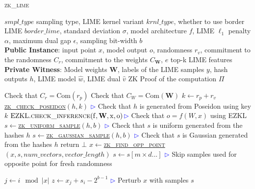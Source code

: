 \begin{algorithm}[H]
\begin{algorithmic}[1]
   \caption{\textsc{zk\_lime}}
   \label{alg:zk_lime}
    $smpl\_type$ sampling type, LIME kernel variant $krnl\_type$, whether to use border LIME $border\_lime$, standard deviation $\sigma$, model architecture $f$, LIME $\ell_1$ penalty $\alpha$, maximum dual gap $\epsilon$, sampling bit-width $b$\\
    \STATE \textbf{Public Instance}: input point $x$, model output $o$, randomness $r_v$, commitment to the randomness $C_r$, commitment to the weights $C_\mathbf{W}$, $e$ top-k LIME features\\
    \STATE \textbf{Private Witness}: Model weights $\mathbf{W}$, labels of the LIME samples $y$, hash outputs $h$, LIME model $\hat{w}$, LIME dual $\hat{v}$
     ZK Proof of the computation $\Pi$

    \STATE Check that $C_r = \text{Com}(r_p)$
    \STATE Check that $C_W = \text{Com}(\mathbf{W})$
    \STATE $k \leftarrow r_p + r_v$
    \STATE \hyperref[alg:zk_check_poseidon]{\textsc{zk\_check\_poseidon}}$(h, k)$ \hfill\textcolor{blue}{$\rhd$} Check that $h$ is generated from Poseidon using key $k$
    \STATE $\rm{EZKL}.\textsc{check\_inference}(f, \mathbf{W}, x, o)$\hfill\textcolor{blue}{$\rhd$} Check that $o = f(W, x)$ using EZKL
        \STATE $s \gets $\hyperref[alg:zk_uniform_sample]{\textsc{zk\_uniform\_sample}}$\left( h, b\right)$ \hfill\textcolor{blue}{$\rhd$} Check that $s$ is uniform generated from the hashes $h$
        \STATE $s \gets $\hyperref[alg:zk_gaussian_sample]{\textsc{zk\_gaussian\_sample}}$\left(h, b\right)$ \hfill\textcolor{blue}{$\rhd$} Check that $s$ is Gaussian generated from the hashes $h$
    \ELSE
        \STATE return $\bot$
    \ENDIF
        \STATE $x \gets $\hyperref[alg:zk_find_opp_point]{\textsc{zk\_find\_opp\_point}}$\left(x, s, num\_vectors, vector\_length \right)$ 
        \STATE $s \gets s[m \times d ...]$ \hfill\textcolor{blue}{$\rhd$} Skip samples used for opposite point for fresh randomness
    \ENDIF

        \STATE $j \leftarrow i \mod |x|$
        \STATE $z \leftarrow x_j + s_i - 2^{b-1}$ \hfill\textcolor{blue}{$\rhd$} Perturb $x$ with samples $s$
    \ENDFOR
    

\end{algorithmic}
\end{algorithm}
